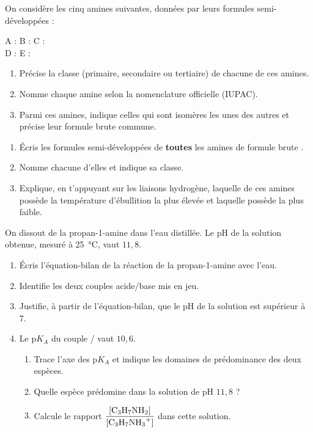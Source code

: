 \documentclass[11pt]{article}
\newcounter{popsec}
\newcounter{popsub}
\newcommand{\courssub}[1]{%
  \stepcounter{popsub}%
  \par\vspace{9pt}\noindent{\popxbold\fontsize{11.5}{13}\selectfont\color{popink}{\color{poporange}\thepopsec.\thepopsub}\hspace{6pt}#1}\par\nopagebreak\vspace{4pt}
}
\begin{document}
\courssub{Je m'entraîne}

\begin{exercice}
On considère les cinq amines suivantes, données par leurs formules semi-développées :
\begin{center}
A :  \qquad
B :  \qquad
C :  \\[6pt]
D :  \qquad
E : 
\end{center}
\begin{enumerate}
\item Précise la classe (primaire, secondaire ou tertiaire) de chacune de ces amines.
\item Nomme chaque amine selon la nomenclature officielle (IUPAC).
\item Parmi ces amines, indique celles qui sont isomères les unes des autres et précise leur formule brute commune.
\end{enumerate}
\end{exercice}

\begin{exercice}
\begin{enumerate}
\item Écris les formules semi-développées de \textbf{toutes} les amines de formule brute .
\item Nomme chacune d'elles et indique sa classe.
\item Explique, en t'appuyant sur les liaisons hydrogène, laquelle de ces amines possède la température d'ébullition la plus élevée et laquelle possède la plus faible.
\end{enumerate}
\end{exercice}

\begin{exercice}
On dissout de la propan-1-amine  dans l'eau distillée. Le pH de la solution obtenue, mesuré à \SI{25}{\celsius}, vaut $11,8$.
\begin{enumerate}
\item Écris l'équation-bilan de la réaction de la propan-1-amine avec l'eau.
\item Identifie les deux couples acide/base mis en jeu.
\item Justifie, à partir de l'équation-bilan, que le pH de la solution est supérieur à 7.
\item Le p$K_A$ du couple / vaut $10,6$. 
\begin{enumerate}
\item Trace l'axe des p$K_A$ et indique les domaines de prédominance des deux espèces.
\item Quelle espèce prédomine dans la solution de pH $11,8$ ?
\item Calcule le rapport $\dfrac{[\ce{C3H7NH2}]}{[\ce{C3H7NH3+}]}$ dans cette solution.
\end{enumerate}
\end{enumerate}
\end{exercice}
\end{document}
